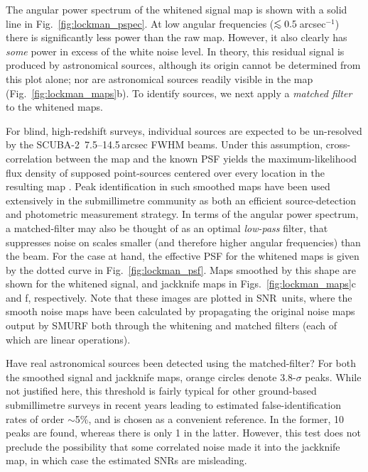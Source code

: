 \documentclass[useAMS,usenatbib,nofootinbib]{mn2e}
\newcommand{\snr}{SNR}
\newcommand{\scuba}{SCUBA-2}
\def\lsim{\mathrel{\lower2.5pt\vbox{\lineskip=0pt\baselineskip=0pt
          \hbox{$<$}\hbox{$\sim$}}}}
\begin{document}
The angular power spectrum of the whitened signal map is shown with a
solid line in Fig.~\ref{fig:lockman_pspec}. At low angular frequencies
($\lsim 0.5$\,arcsec$^{-1}$) there is significantly less power than
the raw map. However, it also clearly has \emph{some} power in excess
of the white noise level. In theory, this residual signal is produced
by astronomical sources, although its origin cannot be determined from
this plot alone; nor are astronomical sources readily visible in the
map (Fig.~\ref{fig:lockman_maps}b). To identify sources, we next apply
a \emph{matched filter} to the whitened maps.

For blind, high-redshift surveys, individual sources are expected to
be un-resolved by the \scuba\ 7.5--14.5\,arcsec FWHM beams. Under this
assumption, cross-correlation between the map and the known PSF yields
the maximum-likelihood flux density of supposed point-sources centered
over every location in the resulting map \citep[an extremely
well-known result throughout astronomy, see][]{stetson1987}. Peak
identification in such smoothed maps have been used extensively in the
submillimetre community as both an efficient source-detection and
photometric measurement strategy. In terms of the angular power
spectrum, a matched-filter may also be thought of as an optimal
\emph{low-pass} filter, that suppresses noise on scales smaller (and
therefore higher angular frequencies) than the beam. For the case at
hand, the effective PSF for the whitened maps is given by the dotted
curve in Fig.~\ref{fig:lockman_psf}. Maps smoothed by this shape are
shown for the whitened signal, and jackknife maps in
Figs.~\ref{fig:lockman_maps}c and f, respectively. Note that these
images are plotted in \snr\ units, where the smooth noise maps have
been calculated by propagating the original noise maps output by SMURF
both through the whitening and matched filters (each of which are
linear operations).

Have real astronomical sources been detected using the matched-filter?
For both the smoothed signal and jackknife maps, orange circles denote
3.8-$\sigma$ peaks. While not justified here, this threshold is fairly
typical for other ground-based submillimetre surveys in recent years
\citep[e.g.,][]{coppin2006,perera2008,2009ApJ...707.1201W} leading to
estimated false-identification rates of order $\sim$5\%, and is chosen
as a convenient reference. In the former, 10 peaks are found, whereas
there is only 1 in the latter. However, this test does not preclude
the possibility that some correlated noise made it into the jackknife
map, in which case the estimated \snr s are misleading.
\end{document}
